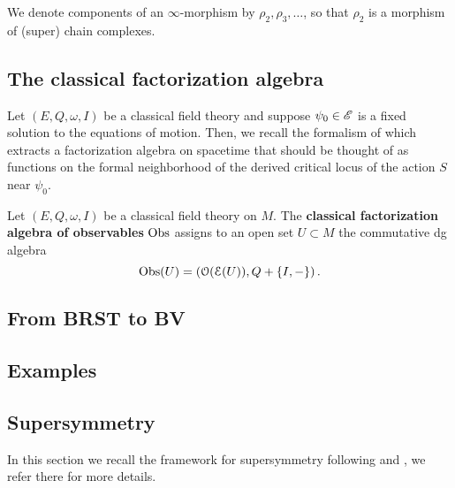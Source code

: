 \documentclass[10pt, oneside]{article}
\begin{document}
We denote components of an $\infty$-morphism by $\rho_2, \rho_3, \dots$, so that $\rho_2$ is a morphism of (super) chain complexes.

\subsection{The classical factorization algebra}


Let $(E, Q, \omega, I)$ be a classical field theory and suppose $\psi_0 \in \mathscr E$ is a fixed solution to the equations of motion. 
Then, we recall the formalism of \cite{CG1,CG2} which extracts a factorization algebra on spacetime that should be thought of as  functions on the formal neighborhood of the derived critical locus of the action $S$ near $\psi_0$. 

\begin{dfn}
Let $(E, Q, \omega, I)$ be a classical field theory on $M$.
The {\bf classical factorization algebra of observables} $\mathrm{Obs}$ assigns to an open set $U \subset M$ the commutative dg algebra
\[
\mathrm{Obs}(U) = \left(\mathcal O(\mathcal E(U)) , Q + \{I,-\}\right) .
\]
\end{dfn}

\subsection{From BRST to BV}




\subsection{Examples}


\subsection{Supersymmetry} \label{sec: susy}

In this section we recall the framework for supersymmetry following \cite{ElliottSafronov} and \cite{DeligneSpinors}, we refer there for more details.
\end{document}
